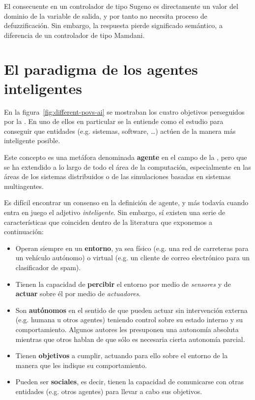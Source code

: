 El consecuente en un controlador de tipo Sugeno es directamente un valor del dominio de la variable de salida, y por tanto no necesita proceso de defuzzificación. Sin embargo, la respuesta pierde significado semántico, a diferencia de un controlador de tipo Mamdani.

\section{El paradigma de los agentes inteligentes}
\label{ch:ci:s:agent-concept}

En la figura~\ref{fig:different-povs-ai} se mostraban los cuatro objetivos perseguidos por la . En uno de ellos en particular se la entiende como el estudio para conseguir que entidades (e.g. sistemas, software, \ldots) actúen de la manera más inteligente posible.

Este concepto es una metáfora denominada \textbf{agente} en el campo de la , pero que se ha extendido a lo largo de todo el área de la computación, especialmente en las áreas de los sistemas distribuidos o de las simulaciones basadas en sistemas multiagentes.

Es difícil encontrar un consenso en la definición de agente, y más todavía cuando entra en juego el adjetivo \textit{inteligente}. Sin embargo, sí existen una serie de características que coinciden dentro de la literatura que exponemos a continuación:

\begin{itemize}
	\item Operan siempre en un \textbf{entorno}, ya sea físico (e.g. una red de carreteras para un vehículo autónomo) o virtual (e.g. un cliente de correo electrónico para un clasificador de spam).
	\item Tienen la capacidad de \textbf{percibir} el entorno por medio de \textit{sensores} y de \textbf{actuar} sobre él por medio de \textit{actuadores}.
	\item Son \textbf{autónomos} en el sentido de que pueden actuar sin intervención externa (e.g. humana u otros agentes) teniendo control sobre su estado interno y su comportamiento. Algunos autores les presuponen una autonomía absoluta mientras que otros hablan de que sólo es necesaria cierta autonomía parcial.
	\item Tienen \textbf{objetivos} a cumplir, actuando para ello sobre el entorno de la manera que les indique su comportamiento.
	\item Pueden ser \textbf{sociales}, es decir, tienen la capacidad de comunicarse con otras entidades (e.g. otros agentes) para llevar a cabo sus objetivos.
\end{itemize}

